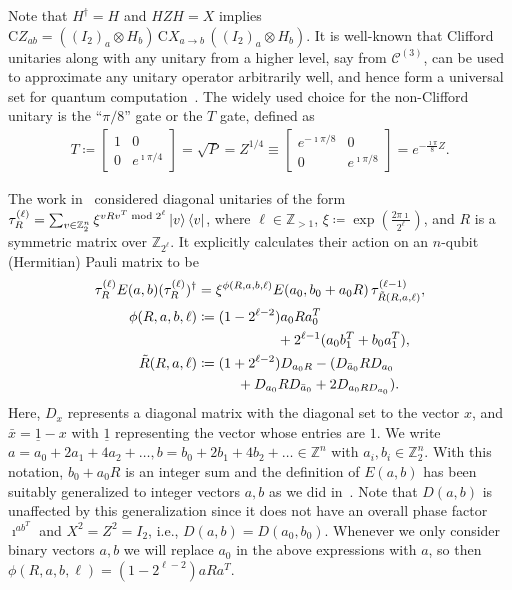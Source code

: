 \documentclass[twoside,romanappendices]{IEEEtran}
\newcommand{\vecnot}[1]{\underline{#1}}
\newcommand{\MZ}{\mathbb{Z}}
\newcommand{\Fn}{\mathbb{Z}_2^n}
\begin{document}
Note that $H^{\dagger} = H$ and $HZH = X$ implies $\text{C}Z_{ab} = ((I_2)_a \otimes H_b)\, \text{C}X_{a \rightarrow b}\, ((I_2)_a \otimes H_b)$.
It is well-known that Clifford unitaries along with any unitary from a higher level, say from $\mathcal{C}^{(3)}$, can be used to approximate any unitary operator arbitrarily well, and hence form a universal set for quantum computation~\cite{Boykin-arxiv99}.
The widely used choice for the non-Clifford unitary is the ``$\pi/8$'' gate or the $T$ gate, defined as 
\begin{align}
T \coloneqq 
\begin{bmatrix}
1 & 0 \\
0 & e^{\imath\pi/4}
\end{bmatrix} = \sqrt{P} = Z^{1/4} \equiv 
\begin{bmatrix}
e^{-\imath\pi/8} & 0 \\
0 & e^{\imath\pi/8}
\end{bmatrix} = e^{-\frac{\imath\pi}{8} Z}.
\end{align}


The work in~\cite{Rengaswamy-pra19} considered diagonal unitaries of the form $\tau_R^{(\ell)} = \sum_{v \in \Fn} \xi^{v R v^T \bmod 2^{\ell}} \ketbra{v}$, where $\ell \in \mathbb{Z}_{>1}$, $\xi \coloneqq \exp(\frac{2\pi\imath}{2^{\ell}})$, and $R$ is a symmetric matrix over $\MZ_{2^{\ell}}$.
It explicitly calculates their action on an $n$-qubit (Hermitian) Pauli matrix to be
\begin{align}
\label{eq:tau_Eab}
\tau_R^{(\ell)} E(a,b) ( \tau_R^{(\ell)} )^{\dagger} & = \xi^{\phi(R,a,b,\ell)} E(a_0, b_0 + a_0 R) \, \tau_{\tilde{R}(R,a,\ell)}^{(\ell-1)}, \\
\phi(R,a,b,\ell) & \coloneqq (1 - 2^{\ell-2}) a_0 R a_0^T \nonumber \\
%
  & \hspace*{2cm} + 2^{\ell-1} (a_0 b_1^T + b_0 a_1^T), \\
\tilde{R}(R,a,\ell) & \coloneqq (1 + 2^{\ell-2}) D_{a_0 R} - (D_{\bar{a}_0} R D_{a_0} \nonumber \\
%
  & \hspace*{1cm} + D_{a_0} R D_{\bar{a}_0} + 2 D_{a_0 R D_{a_0}}).
\end{align}
Here, $D_x$ represents a diagonal matrix with the diagonal set to the vector $x$, and $\bar{x} = \vecnot{1} - x$ with $\vecnot{1}$ representing the vector whose entries are $1$.
We write $a = a_0 + 2a_1 + 4a_2 + \ldots, b = b_0 + 2b_1 + 4b_2 + \ldots \in \mathbb{Z}^n$ with $a_i,b_i \in \mathbb{Z}_2^n$.
With this notation, $b_0 + a_0 R$ is an integer sum and the definition of $E(a,b)$ has been suitably generalized to integer vectors $a,b$ as we did in~\cite{Rengaswamy-pra19}.
Note that $D(a,b)$ is unaffected by this generalization since it does not have an overall phase factor $\imath^{ab^T}$ and $X^2 = Z^2 = I_2$, i.e., $D(a,b) = D(a_0,b_0)$.
Whenever we only consider binary vectors $a,b$ we will replace $a_0$ in the above expressions with $a$, so then $\phi(R,a,b,\ell) = (1 - 2^{\ell-2}) a R a^T$.
\end{document}
